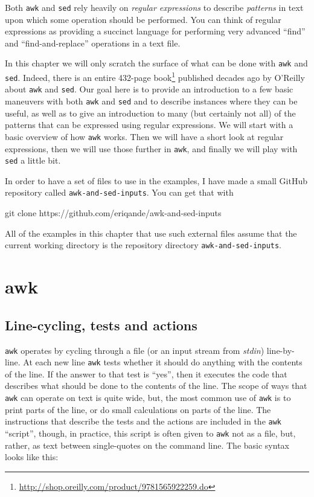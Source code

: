 \documentclass[]{krantz}
\makeatletter
\newenvironment{Shaded}{\begin{snugshade}}{\end{snugshade}}
\newcommand{\FunctionTok}[1]{\textcolor[rgb]{0,0,0}{#1}}
\newcommand{\NormalTok}[1]{#1}
\renewcommand{\href}[2]{#2\footnote{\url{#1}}}
\newenvironment{kframe}{%
\medskip{}
\setlength{\fboxsep}{.8em}
 \def\at@end@of@kframe{}%
 \ifinner\ifhmode%
  \def\at@end@of@kframe{\end{minipage}}%
  \begin{minipage}{\columnwidth}%
 \fi\fi%
 \def\FrameCommand##1{\hskip\@totalleftmargin \hskip-\fboxsep
 \colorbox{shadecolor}{##1}\hskip-\fboxsep
     \hskip-\linewidth \hskip-\@totalleftmargin \hskip\columnwidth}%
 \MakeFramed {\advance\hsize-\width
   \@totalleftmargin\z@ \linewidth\hsize
   \@setminipage}}%
 {\par\unskip\endMakeFramed%
 \at@end@of@kframe}
\renewenvironment{Shaded}{\begin{kframe}}{\end{kframe}}
\makeatother
\begin{document}
Both \texttt{awk} and \texttt{sed} rely heavily on \emph{regular expressions} to describe \emph{patterns}
in text upon which some operation should be performed. You can think of
regular expressions as providing a succinct language for performing very advanced ``find''
and ``find-and-replace'' operations
in a text file.

In this chapter we will only scratch the surface of what can be done with \texttt{awk} and \texttt{sed}. Indeed,
there is an entire \href{http://shop.oreilly.com/product/9781565922259.do}{432-page book} published decades
ago by O'Reilly about \texttt{awk} and \texttt{sed}. Our goal here is to provide an introduction to a few basic
maneuvers with both \texttt{awk} and \texttt{sed} and to describe instances where they can be useful, as well as
to give an introduction to many (but certainly not all) of the patterns that can be expressed
using regular expressions. We will start with a basic overview of how \texttt{awk} works. Then we will
have a short look at regular expressions, then we will use those further in \texttt{awk}, and finally we
will play with \texttt{sed} a little bit.

In order to have a set of files to use in the examples, I have made a small GitHub
repository called \texttt{awk-and-sed-inputs}. You can get that with

\begin{Shaded}
\begin{Highlighting}[]
\FunctionTok{git}\NormalTok{ clone https://github.com/eriqande/awk-and-sed-inputs}
\end{Highlighting}
\end{Shaded}

All of the examples in this chapter that use such external files
assume that the current working directory is
the repository directory \texttt{awk-and-sed-inputs}.

\hypertarget{awk}{%
\section{awk}\label{awk}}

\hypertarget{line-cycling-tests-and-actions}{%
\subsection{Line-cycling, tests and actions}\label{line-cycling-tests-and-actions}}

\texttt{awk} operates by cycling through a file (or an input stream from \emph{stdin}) line-by-line. At each
new line \texttt{awk} tests whether it should do anything with the contents of the line. If the answer
to that test is ``yes'', then it executes the code that describes what should be done to the
contents of the line. The scope of ways that \texttt{awk} can operate on text is quite wide, but,
the most common use of \texttt{awk} is to print parts of the line, or do small calculations on parts of the
line. The instructions that describe the tests and the actions are included in the \texttt{awk} ``script'', though,
in practice, this script is often given to \texttt{awk} not as a file, but, rather, as text between single-quotes on the
command line. The basic syntax looks like this:
\end{document}
